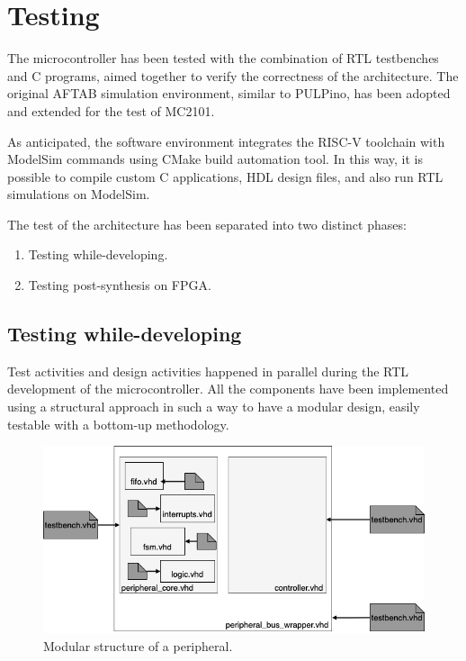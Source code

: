 \section{Testing}
The microcontroller has been tested with the combination of RTL testbenches and C programs, aimed together to verify the correctness of the architecture. The original AFTAB simulation environment, similar to PULPino, has been adopted and extended for the test of MC2101.

As anticipated, the software environment integrates the RISC-V toolchain with ModelSim commands using CMake build automation tool. In this way, it is possible to compile custom C applications, HDL design files, and also run RTL simulations on ModelSim.

The test of the architecture has been separated into two distinct phases:
\begin{enumerate}
\item Testing while-developing.
\item Testing post-synthesis on FPGA.
\end{enumerate}  

\subsection{Testing while-developing}
Test activities and design activities happened in parallel during the RTL development of the microcontroller. All the components have been implemented using a structural approach in such a way to have a modular design, easily testable with a bottom-up methodology.

\begin{figure}[h]
\vspace{0.5cm}
\includegraphics[scale=0.6]{./images/testing}
\caption{Modular structure of a peripheral.}
\label{fig:testing} %
\end{figure}

